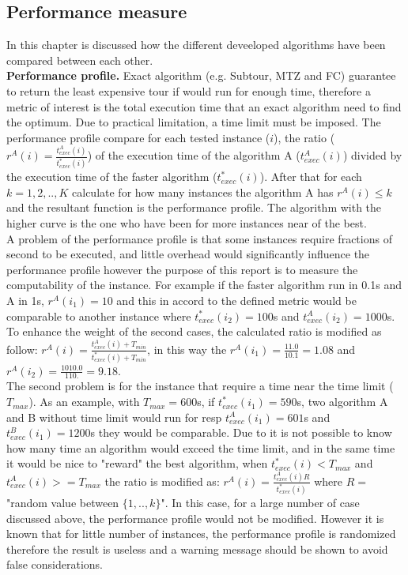 \documentclass[10pt, english, openany]{report}
\begin{document}
\begin{appendices}
		\chapter{Performance measure}
			In this chapter is discussed how the different deveeloped algorithms have been compared between each other.\\
			\textbf{Performance profile.} Exact algorithm (e.g. Subtour, MTZ and FC) guarantee to return the least expensive tour if would run for enough time, therefore a metric of interest is the total execution time that an exact algorithm need to find the optimum. 
			Due to practical limitation, a time limit must be imposed. The performance profile compare for each tested instance ($ i $), the ratio ($ r^A(i) = \frac{t_{exec}^A(i)}{t_{exec}^*(i)} $) of the execution time of the algorithm A ($ t_{exec}^A(i) $) divided by the execution time of the faster algorithm ($ t_{exec}^*(i) $).
			After that for each $ k = 1, 2, .., K $ calculate for how many instances the algorithm A has $ r^A(i) \le k $ and the resultant function is the performance profile.
			The algorithm with the higher curve is the one who have been for more instances near of the best.\\
			A problem of the performance profile is that some instances require fractions of second to be executed, and little overhead would significantly influence the performance profile however the purpose of this report is to measure the computability of the instance. For example if the faster algorithm run in 0.1s and A in 1s, $ r^A(i_1) = 10 $ and this in accord to the defined metric would be comparable to another instance where $ t_{exec}^*(i_2) = 100 $s and $ t_{exec}^A(i_2) = 1000 $s. To enhance the weight of the second cases, the calculated ratio is modified as follow: $ r^A(i) = \frac{t_{exec}^A(i)+T_{min}}{t_{exec}^*(i)+T_{min}} $, in this way the $ r^A(i_1) = \frac{11.0}{10.1} = 1.08 $ and $ r^A(i_2) = \frac{1010.0}{110.} = 9.18 $.\\
			The second problem is for the instance that require a time near the time limit ($ T_{max} $). As an example, with $ T_{max} = 600 $s, if $ t_{exec}^*(i_1) = 590$s, two algorithm A and B without time limit would run for resp $ t_{exec}^A(i_1) = 601$s and $ t_{exec}^B(i_1) = 1200$s they would be comparable. Due to it is not possible to know how many time an algorithm would exceed the time limit, and in the same time it would be nice to "reward" the best algorithm, when $ t_{exec}^*(i) < T_{max} $ and $ t_{exec}^A(i) >= T_{max} $ the ratio is modified as:  $ r^A(i) = \frac{t_{exec}^A(i)R}{t_{exec}^*(i)} $ where $ R = $ "random value between $ \{1,..,k\} $". In this case, for a large number of case discussed above, the performance profile would not be modified. However it is known that for little number of instances, the performance profile is randomized therefore the result is useless and a warning message should be shown to avoid false considerations.
			

\end{appendices}
\end{document}
